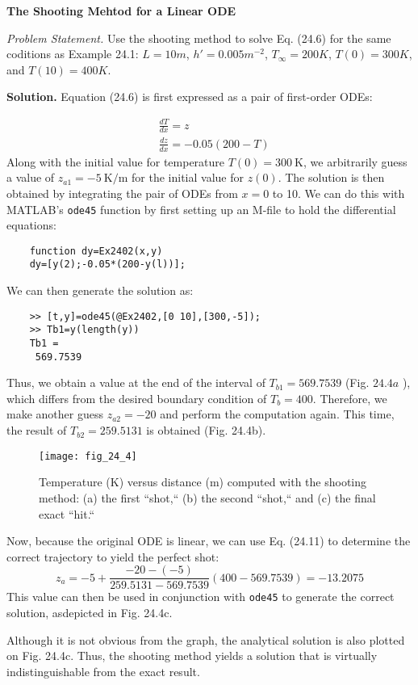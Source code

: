 \documentclass[../main.tex]{subfiles}
\begin{document}
\begin{exmp}
    \textbf{The Shooting Mehtod for a Linear ODE}

    \noindent \textit{Problem Statement.} Use the shooting method to solve Eq. (24.6) for the same coditions as Example 24.1: $L=10m$, $h'=0.005m^{-2}$, $T_\infty=200K$, $T(0)=300K$, and $T(10)=400K.$

    \noindent \textbf{Solution.} Equation (24.6) is first expressed as a pair of first-order ODEs:

    $$
    \begin{aligned}
    &\frac{d T}{d x}=z \\
    &\frac{d z}{d x}=-0.05(200-T)
    \end{aligned}
    $$
    Along with the initial value for temperature $T(0)=300 \mathrm{~K}$, we arbitrarily guess a value   of $z_{a 1}=-5 \mathrm{~K} / \mathrm{m}$ for the initial value for $z(0)$. The solution is then   obtained by integrating the pair of ODEs from $x=0$ to 10. We can do this with MATLAB's \texttt{ode45} function by first setting up an M-file to hold the differential equations:
    \begin{lstlisting}
    function dy=Ex2402(x,y)
    dy=[y(2);-0.05*(200-y(l))];
    \end{lstlisting}
    
    \noindent We can then generate the solution as:
    \begin{lstlisting}
    >> [t,y]=ode45(@Ex2402,[0 10],[300,-5]);
    >> Tb1=y(length(y))
    Tb1 =
     569.7539
    \end{lstlisting}
    

    \noindent Thus, we obtain a value at the end of the interval of $T_{b 1}=569.7539$ (Fig. $24.4 a$ ), which differs from the desired boundary condition of $T_{b}=400$. Therefore, we make another guess $z_{a 2}=-20$ and perform the computation again. This time, the result of $T_{b 2}=259.5131$ is obtained (Fig. 24.4b).

    \begin{figure}[H]
        \centering
        \texttt{[image: fig\_24\_4]}
       \caption{\textsf{Temperature (K) versus distance (m) computed with the shooting method: (a) the first ``shot,`` 
       (b) the second ``shot,`` and (c) the final exact ``hit.``}}\label{fig:fig_24_4}
    \end{figure}

    Now, because the original ODE is linear, we can use Eq. (24.11) to determine the correct trajectory to yield the perfect shot:
    $$
    z_{a}=-5+\frac{-20-(-5)}{259.5131-569.7539}(400-569.7539)=-13.2075
    $$
    \noindent This value can then be used in conjunction with \texttt{ode45} to generate the correct solution, asdepicted in Fig. 24.4c.

    Although it is not obvious from the graph, the analytical solution is also plotted on Fig. 24.4c. Thus, the shooting method yields a solution that is virtually indistinguishable from the exact result.
\end{exmp}
\end{document}
